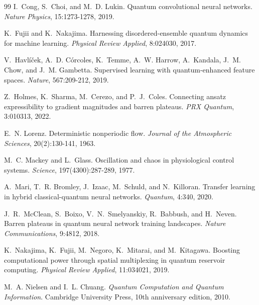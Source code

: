 \documentclass{article}
\begin{document}
{\begin{thebibliography}{99}
I.~Cong, S.~Choi, and M.~D. Lukin.
\newblock Quantum convolutional neural networks.
\newblock \emph{Nature Physics}, 15:1273-1278, 2019.

K.~Fujii and K.~Nakajima.
\newblock Harnessing disordered-ensemble quantum dynamics for machine learning.
\newblock \emph{Physical Review Applied}, 8:024030, 2017.

V.~Havl\'i\v{c}ek, A.~D. C\'orcoles, K.~Temme, A.~W. Harrow, A.~Kandala, J.~M. Chow, and J.~M. Gambetta.
\newblock Supervised learning with quantum-enhanced feature spaces.
\newblock \emph{Nature}, 567:209-212, 2019.

Z.~Holmes, K.~Sharma, M.~Cerezo, and P.~J.~Coles.
\newblock Connecting ansatz expressibility to gradient magnitudes and barren plateaus.
\newblock \emph{PRX Quantum}, 3:010313, 2022.

E.~N. Lorenz.
\newblock Deterministic nonperiodic flow.
\newblock \emph{Journal of the Atmospheric Sciences}, 20(2):130-141, 1963.

M.~C. Mackey and L.~Glass.
\newblock Oscillation and chaos in physiological control systems.
\newblock \emph{Science}, 197(4300):287-289, 1977.

A.~Mari, T.~R. Bromley, J.~Izaac, M.~Schuld, and N.~Killoran.
\newblock Transfer learning in hybrid classical-quantum neural networks.
\newblock \emph{Quantum}, 4:340, 2020.

J.~R.~McClean, S.~Boixo, V.~N.~Smelyanskiy, R.~Babbush, and H.~Neven.
\newblock Barren plateaus in quantum neural network training landscapes.
\newblock \emph{Nature Communications}, 9:4812, 2018.

K.~Nakajima, K.~Fujii, M.~Negoro, K.~Mitarai, and M.~Kitagawa.
\newblock Boosting computational power through spatial multiplexing in quantum reservoir computing.
\newblock \emph{Physical Review Applied}, 11:034021, 2019.

M.~A. Nielsen and I.~L. Chuang.
\newblock \emph{Quantum Computation and Quantum Information}.
\newblock Cambridge University Press, 10th anniversary edition, 2010.


\end{thebibliography}}
\end{document}
